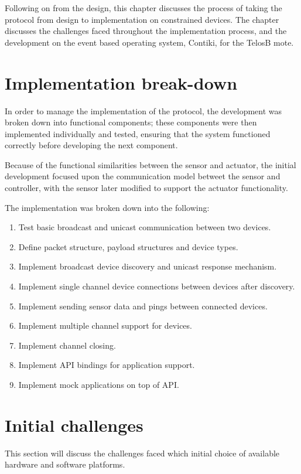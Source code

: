Following on from the design, this chapter discusses the process of taking the protocol from design to implementation on constrained devices. The chapter discusses the challenges faced throughout the implementation process, and the development on the event based operating system, Contiki, for the TelosB mote. 


\section{Implementation break-down} %
\label{sec:implementation_break_down}
In order to manage the implementation of the protocol, the development was broken down into functional components; these components were then implemented individually and tested, ensuring that the system functioned correctly before developing the next component.

Because of the functional similarities between the sensor and actuator, the initial development focused upon the communication model betweet the sensor and controller, with the sensor later modified to support the actuator functionality.

The implementation was broken down into the following:
\vspace{-5mm} 
\begin{enumerate}
	\item Test basic broadcast and unicast communication between two devices.
	\item Define packet structure, payload structures and device types.
	\item Implement broadcast device discovery and unicast response mechanism.
	\item Implement single channel device connections between devices after discovery.
	\item Implement sending sensor data and pings between connected devices.
	\item Implement multiple channel support for devices.
	\item Implement channel closing.
	\item Implement API bindings for application support.
	\item Implement mock applications on top of API.
\end{enumerate}


\section{Initial challenges} %
\label{sec:initial_challenges}
This section will discuss the challenges faced which initial choice of available hardware and software platforms.
